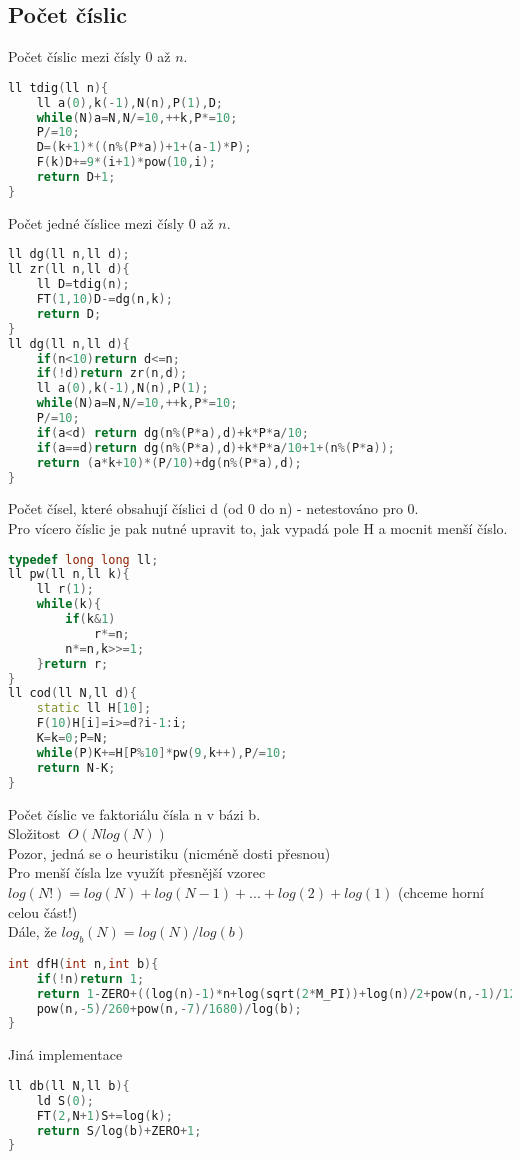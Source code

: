 \documentclass[11pt]{article}
\begin{document}
\subsection{Počet číslic}
Počet číslic mezi čísly 0 až $n$.
\begin{lstlisting}[language=C++]
ll tdig(ll n){
    ll a(0),k(-1),N(n),P(1),D;
    while(N)a=N,N/=10,++k,P*=10;
    P/=10;
    D=(k+1)*((n%(P*a))+1+(a-1)*P);
    F(k)D+=9*(i+1)*pow(10,i);
    return D+1;
}
\end{lstlisting}
Počet jedné číslice mezi čísly 0 až $n$.
\begin{lstlisting}[language=C++]
ll dg(ll n,ll d);
ll zr(ll n,ll d){
    ll D=tdig(n);
    FT(1,10)D-=dg(n,k);
    return D;
}
ll dg(ll n,ll d){
    if(n<10)return d<=n;
    if(!d)return zr(n,d);
    ll a(0),k(-1),N(n),P(1);
    while(N)a=N,N/=10,++k,P*=10;
    P/=10;
    if(a<d) return dg(n%(P*a),d)+k*P*a/10;
    if(a==d)return dg(n%(P*a),d)+k*P*a/10+1+(n%(P*a));
    return (a*k+10)*(P/10)+dg(n%(P*a),d);
}
\end{lstlisting}
Počet čísel, které obsahují číslici \textsf{d} (od 0 do \textsf{n}) - netestováno pro 0. 
\\Pro vícero číslic je pak nutné upravit to, jak vypadá pole \textsf{H} a mocnit menší číslo.
\begin{lstlisting}[language=C++]
typedef long long ll;
ll pw(ll n,ll k){
    ll r(1);
    while(k){
        if(k&1)
            r*=n;
        n*=n,k>>=1;
    }return r;
}
ll cod(ll N,ll d){
    static ll H[10];
    F(10)H[i]=i>=d?i-1:i;
    K=k=0;P=N;
    while(P)K+=H[P%10]*pw(9,k++),P/=10;
    return N-K;
}
\end{lstlisting}
Počet číslic ve faktoriálu čísla \textsf{n} v bázi \textsf{b}.
\\Složitost $~O(Nlog(N))$
\\Pozor, jedná se o heuristiku (nicméně dosti přesnou)
\\Pro menší čísla lze využít přesnější vzorec $log(N!)=log(N)+log(N-1)+...+log(2)+log(1)$ (chceme horní celou část!)
\\Dále, že $log_b(N)=log(N)/log(b)$
\begin{lstlisting}[language=C++]
int dfH(int n,int b){
    if(!n)return 1;
    return 1-ZERO+((log(n)-1)*n+log(sqrt(2*M_PI))+log(n)/2+pow(n,-1)/12+pow(n,-3)/360+
    pow(n,-5)/260+pow(n,-7)/1680)/log(b);
}
\end{lstlisting}
Jiná implementace
\begin{lstlisting}[language=C++]
ll db(ll N,ll b){
    ld S(0);
    FT(2,N+1)S+=log(k);
	return S/log(b)+ZERO+1;
}
\end{lstlisting}
\end{document}
